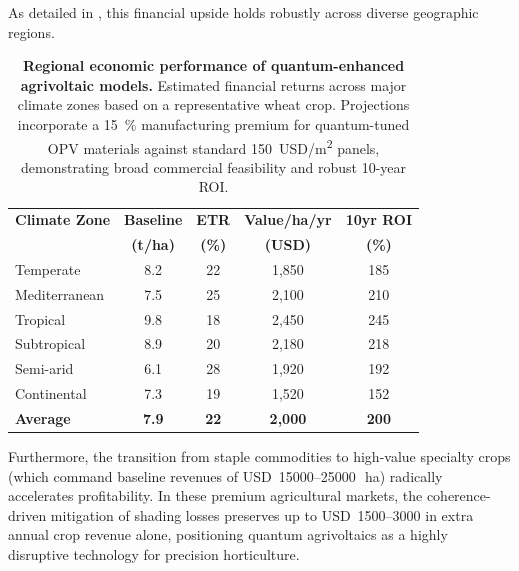 As detailed in , this financial upside holds robustly across diverse geographic regions.

\begin{table}[ht]
\centering
\caption{\textbf{Regional economic performance of quantum-enhanced agrivoltaic models.} Estimated financial returns across major climate zones based on a representative wheat crop. Projections incorporate a \SI{15}{\percent} manufacturing premium for quantum-tuned OPV materials against standard \SI{150}{USD/m^2} panels, demonstrating broad commercial feasibility and robust 10-year ROI.}
\label{tab:economic_analysis}
\begin{tabular}{lcccc}
	\toprule
	\textbf{Climate Zone} & \textbf{Baseline} & \textbf{ETR}  & \textbf{Value/ha/yr} & \textbf{10yr ROI} \\
	                      &  \textbf{(t/ha)}  & \textbf{(\%)} &    \textbf{(USD)}    &   \textbf{(\%)}   \\ \midrule
	Temperate             &        8.2        &      22       &        1,850         &        185        \\
	Mediterranean         &        7.5        &      25       &        2,100         &        210        \\
	Tropical              &        9.8        &      18       &        2,450         &        245        \\
	Subtropical           &        8.9        &      20       &        2,180         &        218        \\
	Semi-arid             &        6.1        &      28       &        1,920         &        192        \\
	Continental           &        7.3        &      19       &        1,520         &        152        \\ \midrule
	\textbf{Average}      &   \textbf{7.9}    &  \textbf{22}  &    \textbf{2,000}    &   \textbf{200}    \\ \bottomrule
\end{tabular}
\end{table}

Furthermore, the transition from staple commodities to high-value specialty crops (which command baseline revenues of USD~\numrange{15000}{25000}\,\si{\per\hectare}) radically accelerates profitability. In these premium agricultural markets, the coherence-driven mitigation of shading losses preserves up to USD~\numrange{1500}{3000} in extra annual crop revenue alone, positioning quantum agrivoltaics as a highly disruptive technology for precision horticulture.

